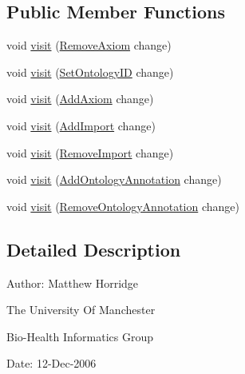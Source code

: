 \subsection*{Public Member Functions}
\begin{DoxyCompactItemize}
\item 
void \hyperlink{classorg_1_1semanticweb_1_1owlapi_1_1util_1_1_o_w_l_ontology_change_visitor_adapter_a6f3681873b1b11ddd7c62fe40684e2c2}{visit} (\hyperlink{classorg_1_1semanticweb_1_1owlapi_1_1model_1_1_remove_axiom}{Remove\-Axiom} change)
\item 
void \hyperlink{classorg_1_1semanticweb_1_1owlapi_1_1util_1_1_o_w_l_ontology_change_visitor_adapter_ab721e902c0b25aeca1ab83bfb9d0af1b}{visit} (\hyperlink{classorg_1_1semanticweb_1_1owlapi_1_1model_1_1_set_ontology_i_d}{Set\-Ontology\-I\-D} change)
\item 
void \hyperlink{classorg_1_1semanticweb_1_1owlapi_1_1util_1_1_o_w_l_ontology_change_visitor_adapter_ac89dfca73c734d327bff57be43b6c73c}{visit} (\hyperlink{classorg_1_1semanticweb_1_1owlapi_1_1model_1_1_add_axiom}{Add\-Axiom} change)
\item 
void \hyperlink{classorg_1_1semanticweb_1_1owlapi_1_1util_1_1_o_w_l_ontology_change_visitor_adapter_a04d50a40c0ea584e8ab0bb4625ef22a7}{visit} (\hyperlink{classorg_1_1semanticweb_1_1owlapi_1_1model_1_1_add_import}{Add\-Import} change)
\item 
void \hyperlink{classorg_1_1semanticweb_1_1owlapi_1_1util_1_1_o_w_l_ontology_change_visitor_adapter_a41c539f15261898a66cc3ec98145b8cb}{visit} (\hyperlink{classorg_1_1semanticweb_1_1owlapi_1_1model_1_1_remove_import}{Remove\-Import} change)
\item 
void \hyperlink{classorg_1_1semanticweb_1_1owlapi_1_1util_1_1_o_w_l_ontology_change_visitor_adapter_a14286339377a86115608e7c48bf9e18d}{visit} (\hyperlink{classorg_1_1semanticweb_1_1owlapi_1_1model_1_1_add_ontology_annotation}{Add\-Ontology\-Annotation} change)
\item 
void \hyperlink{classorg_1_1semanticweb_1_1owlapi_1_1util_1_1_o_w_l_ontology_change_visitor_adapter_a17cc6365b9395dba5c3fcbcfcc40310d}{visit} (\hyperlink{classorg_1_1semanticweb_1_1owlapi_1_1model_1_1_remove_ontology_annotation}{Remove\-Ontology\-Annotation} change)
\end{DoxyCompactItemize}


\subsection{Detailed Description}
Author\-: Matthew Horridge\par
 The University Of Manchester\par
 Bio-\/\-Health Informatics Group\par
 Date\-: 12-\/\-Dec-\/2006\par
\par
 

